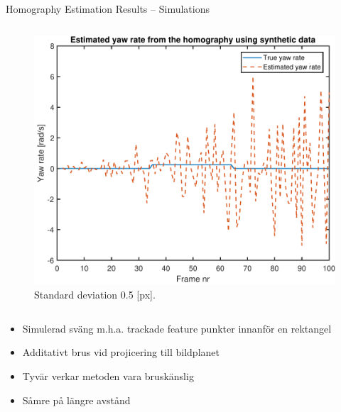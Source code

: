 \documentclass{beamer}
\renewcommand{\a}{\r{a}\xspace}
\renewcommand{\aa}{\"a\xspace}
\renewcommand{\o}{\"o\xspace}
\begin{document}
\begin{frame}{Homography Estimation Results -- Simulations}
\begin{columns}[T]
\begin{figure}
		\includegraphics[height=0.375\textheight]{Hom/rect_5e-1}
		\vspace{-1.25em}
		\caption{Standard deviation 0.5 [px].}
	\end{figure}
	\end{columns}

	\note
	{
		\begin{itemize}
			\item Simulerad sv\aa{}ng m.h.a. trackade feature punkter innanf\o{}r en rektangel
			\vspace{2em}
			\item Additativt brus vid projicering till bildplanet
			\item Tyv\aa{}r verkar metoden vara brusk\aa{}nslig
			\item S\a{}mre p\a{} l\aa{}ngre avst\a{}nd
		\end{itemize}
	}
\end{frame}
\end{document}
